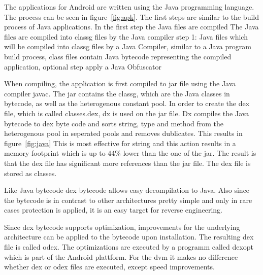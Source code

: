 The applications for Android are written using the Java programming language.
The process can be seen in figure~\ref{fig:apk}.
The first steps are similar to the build process of Java applications.
In the first step the Java files are compiled
The Java files are compiled into \gls{classg} files by the Java compiler
step 1:  Java files which will be compiled into \gls{classg} files by a Java Compiler,  similar to a Java program build process, class files contain Java bytecode representing the compiled application, optional step apply a Java Obfuscator\newline

When compiling, the application is first compiled to \gls{jar} file using the Java compiler javac.
The jar contains the \gls{classg}, which are the Java classes in bytecode, as well as the heterogenous constant pool.
In order to create the dex file, which is called classes.dex, dx is used on the \gls{jar} file.
Dx compiles the Java bytecode to \gls{dex} byte code and sorts string, type and method from the heterogenous pool in seperated pools and removes dublicates.
This results in figure~\ref{fig:java}
This is most effective for string and this action results in a memory footprint which is up to 44\% lower than the one of the \gls{jar}.
The result is that the \gls{dex} file has significant more references than the \gls{jar} file.
The \gls{dex} file is stored as classes.\cite{ehringerDalvik}

Like Java bytecode \gls{dex} bytecode allows easy decompilation to Java.
Also since the bytecode is in contrast to other architectures pretty simple and only in rare cases protection is applied, it is an easy target for reverse engineering.

Since \gls{dex} bytecode supports optimization, improvements for the underlying architecture can be applied to the bytecode upon installation.
The resulting \gls{dex} file is called \gls{odex}.
The optimizations are executed by a programm called dexopt which is part of the Android plattform.
For the \gls{dvm} it makes no difference whether \gls{dex} or \gls{odex} files are executed, except speed improvements.
%





